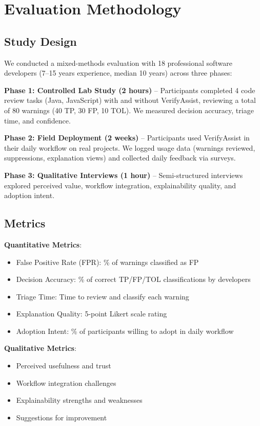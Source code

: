 \documentclass[conference]{IEEEtran}
\begin{document}
\section{Evaluation Methodology}

\subsection{Study Design}

We conducted a mixed-methods evaluation with 18 professional software developers (7--15 years experience, median 10 years) across three phases:

\textbf{Phase 1: Controlled Lab Study (2 hours)} -- Participants completed 4 code review tasks (Java, JavaScript) with and without VerifyAssist, reviewing a total of 80 warnings (40 TP, 30 FP, 10 TOL). We measured decision accuracy, triage time, and confidence.

\textbf{Phase 2: Field Deployment (2 weeks)} -- Participants used VerifyAssist in their daily workflow on real projects. We logged usage data (warnings reviewed, suppressions, explanation views) and collected daily feedback via surveys.

\textbf{Phase 3: Qualitative Interviews (1 hour)} -- Semi-structured interviews explored perceived value, workflow integration, explainability quality, and adoption intent.

\subsection{Metrics}

\textbf{Quantitative Metrics}:
\begin{itemize}
\item False Positive Rate (FPR): \% of warnings classified as FP
\item Decision Accuracy: \% of correct TP/FP/TOL classifications by developers
\item Triage Time: Time to review and classify each warning
\item Explanation Quality: 5-point Likert scale rating
\item Adoption Intent: \% of participants willing to adopt in daily workflow
\end{itemize}

\textbf{Qualitative Metrics}:
\begin{itemize}
\item Perceived usefulness and trust
\item Workflow integration challenges
\item Explainability strengths and weaknesses
\item Suggestions for improvement
\end{itemize}
\end{document}
